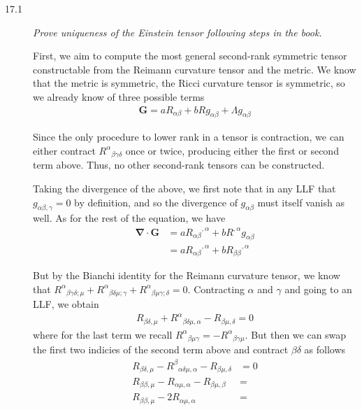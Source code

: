 \documentclass[12pt]{report}
\newcommand{\bm}[1]{\boldsymbol{\mathbf{#1}}}
\begin{document}
\begin{description}
    \item[17.1] \emph{Prove uniqueness of the Einstein tensor following steps in
        the book.}

        First, we aim to compute the most general second-rank symmetric tensor
        constructable from the Reimann curvature tensor and the metric. We know
        that the metric is symmetric, the Ricci curvature tensor is symmetric,
        so we already know of three possible terms
        \begin{align*}
            \bm{G} = aR_{\alpha\beta} + bRg_{\alpha\beta} + \Lambda
                g_{\alpha\beta}
        \end{align*}

        Since the only procedure to lower rank in a tensor is contraction, we
        can either contract ${R^\alpha}_{\beta\gamma\delta}$ once or twice,
        producing either the first or second term above. Thus, no other
        second-rank tensors can be constructed.

        Taking the divergence of the above, we first note that in any LLF that
        $g_{\alpha\beta,\gamma} = 0$ by definition, and so the divergence of
        $g_{\alpha\beta}$ must itself vanish as well. As for the rest of the
        equation, we have
        \begin{align}
            \bm{\nabla} \cdot \bm{G} &= a{R_{\alpha\beta}}^{,\alpha} +
                bR^{,\alpha} g_{\alpha\beta}\nonumber\\
                &= a{R_{\alpha\beta}}^{,\alpha} +
                b{R_{\beta\beta}}^{,\alpha}\label{16.intermediate}
        \end{align}

        But by the Bianchi identity for the Reimann curvature tensor, we know
        that
        ${R^\alpha}_{\beta\gamma\delta;\mu} +
        {R^\alpha}_{\beta\delta\mu;\gamma} +
        {R^\alpha}_{\beta\mu\gamma;\delta}= 0$. Contracting $\alpha$ and
        $\gamma$ and going to an LLF, we obtain
        \begin{align*}
            R_{\beta\delta,\mu} + {R^\alpha}_{\beta\delta\mu,\alpha} -
            R_{\beta\mu,\delta} = 0
        \end{align*}
        where for the last term we recall
        ${R^\alpha}_{\beta\mu\gamma} = - {R^\alpha}_{\beta\gamma\mu}$. But then
        we can swap the first two indicies of the second term above and contract
        $\beta\delta$ as follows
        \begin{align*}
            R_{\beta\delta,\mu} - {R^\beta}_{\alpha\delta\mu,\alpha} -
            R_{\beta\mu,\delta} &= 0\\
            R_{\beta\beta,\mu} - R_{\alpha\mu,\alpha} -
            R_{\beta\mu,\beta} &=\\
            R_{\beta\beta,\mu} - 2R_{\alpha\mu,\alpha} &=
        \end{align*}


\end{description}
\end{document}

